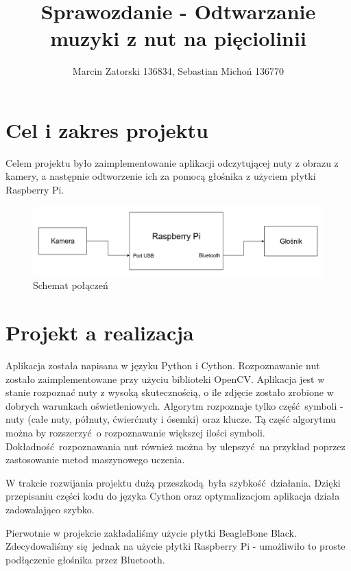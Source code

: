 \documentclass[12pt]{article}
\begin{document}
\title{Sprawozdanie - Odtwarzanie muzyki z nut na pięciolinii}
\author{Marcin Zatorski 136834, Sebastian Michoń 136770}
\date{\vspace{-2ex}}
\maketitle

\section{Cel i zakres projektu}
Celem projektu było zaimplementowanie aplikacji odczytującej nuty z obrazu z kamery, a następnie odtworzenie ich za pomocą głośnika z użyciem płytki Raspberry Pi.

\begin{figure}[h!]
	\centering
	\includegraphics[width=0.9\linewidth]{SW-schematic.png}
	\caption{Schemat połączeń}
	\label{fig:schemat}
\end{figure}
	
\section{Projekt a realizacja}
Aplikacja została napisana w języku Python i Cython. Rozpoznawanie nut zostało zaimplementowane przy użyciu biblioteki OpenCV. Aplikacja jest w stanie rozpoznać nuty z wysoką skutecznością, o ile zdjęcie zostało zrobione w dobrych warunkach oświetleniowych. Algorytm rozpoznaje tylko część symboli - nuty (całe nuty, półnuty, ćwierćnuty i ósemki) oraz klucze. Tą część algorytmu można by rozszerzyć o rozpoznawanie większej ilości symboli. Dokładność rozpoznawania nut również można by ulepszyć na przykład poprzez zastosowanie metod maszynowego uczenia.
	
W trakcie rozwijania projektu dużą przeszkodą była szybkość działania. Dzięki przepisaniu części kodu do języka Cython oraz optymalizacjom aplikacja działa zadowalająco szybko.
	
Pierwotnie w projekcie zakładaliśmy użycie płytki BeagleBone Black. Zdecydowaliśmy się jednak na użycie płytki Raspberry Pi - umożliwiło to proste podłączenie głośnika przez Bluetooth.
	
\end{document}
